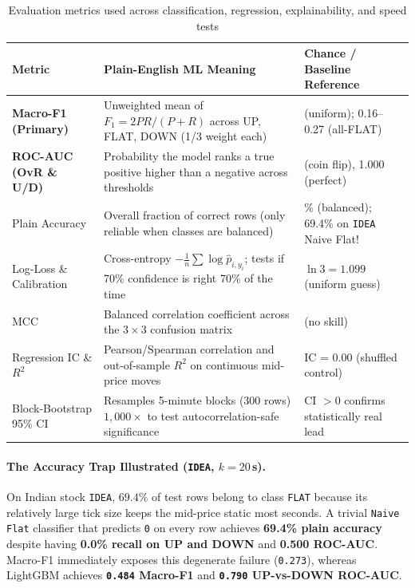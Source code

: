 \documentclass[12pt,a4paper,oneside]{report}
\newcommand{\code}[1]{\texttt{#1}}
\begin{document}
\begin{table}[H]
\centering\scriptsize
\setlength{\tabcolsep}{4pt}
\caption{Evaluation metrics used across classification, regression, explainability, and speed tests}
\label{tab:metrics}
\begin{tabularx}{\linewidth}{@{}>{\raggedright\arraybackslash}p{3.3cm}>{\raggedright\arraybackslash}X>{\raggedright\arraybackslash}p{3.5cm}@{}}
\toprule
\textbf{Metric} & \textbf{Plain-English ML Meaning} & \textbf{Chance / Baseline Reference} \\
\midrule
\textbf{Macro-F1 (Primary)} & Unweighted mean of $F_1 = 2PR/(P+R)$ across UP, FLAT, DOWN (1/3 weight each) & 0.333 (uniform); 0.16--0.27 (all-FLAT) \\
\textbf{ROC-AUC (OvR \& U/D)} & Probability the model ranks a true positive higher than a negative across thresholds & 0.500 (coin flip), 1.000 (perfect) \\
Plain Accuracy & Overall fraction of correct rows (only reliable when classes are balanced) & 33.3\% (balanced); 69.4\% on \code{IDEA} Naive Flat! \\
Log-Loss \& Calibration & Cross-entropy $-\frac{1}{n}\sum \log \hat{p}_{i,y_i}$; tests if 70\% confidence is right 70\% of the time & $\ln 3 = 1.099$ (uniform guess) \\
MCC & Balanced correlation coefficient across the $3{\times}3$ confusion matrix & 0.00 (no skill) \\
Regression IC \& $R^2$ & Pearson/Spearman correlation and out-of-sample $R^2$ on continuous mid-price moves & IC = 0.00 (shuffled control) \\
Block-Bootstrap 95\% CI & Resamples 5-minute blocks (300 rows) $1{,}000\times$ to test autocorrelation-safe significance & CI $> 0$ confirms statistically real lead \\
\bottomrule
\end{tabularx}
\end{table}

\paragraph{The Accuracy Trap Illustrated (\code{IDEA}, $k=20$\,s).} On Indian stock \code{IDEA}, $69.4\%$ of test rows belong to class \code{FLAT} because its relatively large tick size keeps the mid-price static most seconds. A trivial \code{Naive Flat} classifier that predicts \code{0} on every row achieves \textbf{69.4\% plain accuracy} despite having \textbf{0.0\% recall on UP and DOWN} and \textbf{0.500 ROC-AUC}. Macro-F1 immediately exposes this degenerate failure (\code{0.273}), whereas LightGBM achieves \textbf{\code{0.484} Macro-F1} and \textbf{\code{0.790} UP-vs-DOWN ROC-AUC}.
\end{document}
